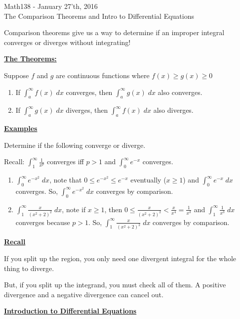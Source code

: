 \documentclass{letter}
\newcommand{\0}[1]{\begin{bmatrix}#1\end{bmatrix}}
\newcommand{\h}[1]{\underline{\textbf{#1}}}
\begin{document}
	\begin{center}
		\LARGE Math138 - January 27'th, 2016\\
		\large The Comparison Theorems and Intro to Differential Equations
	\end{center}
	\vspace{0.25 in}
	
	Comparison theorems give us a way to determine if an improper integral converges or diverges without integrating!
	
	\h{The Theorems:}
	
	Suppose $f$ and $g$ are continuous functions where $f(x) \geq g(x) \geq 0$
	
	\begin{enumerate}
		\item If $\displaystyle \int_a^\infty f(x)\;dx$ converges, then $\displaystyle \int_a^\infty g(x)\;dx$ also converges.
		\item If  $\displaystyle \int_a^\infty g(x)\;dx$ diverges, then  $\displaystyle \int_a^\infty f(x)\;dx$ also diverges.
	\end{enumerate}
	
	\h{Examples}
	
	Determine if the following converge or diverge.
	
	Recall: $\int_1^\infty \frac{1}{x^p}$ converges iff $p>1$ and $\int_0^\infty e^{-x}$ converges.
	
	\begin{enumerate}
		\item $\int_0^\infty e^{-x^2}\;dx$, note that $0 \leq e^{-x^2} \leq e^{-x}$ eventually ($x \geq 1$) and $\int_0^\infty e^{-x}\;dx$ converges. So, $\int_0^\infty e^{-x^2}\;dx$ converges by comparison.
		
		\item $\int_1^\infty \frac{x}{(x^2+2)^2}\;dx$, note if $x \geq 1$, then $0 \leq \frac{x}{(x^2+2)^2} < \frac{x}{x^4} = \frac{1}{x^3}$ and $\int_1^\infty \frac{1}{x^3}\; dx$ converges because $p>1$. So, $\int_1^\infty \frac{x}{(x^2+2)^2}\; dx$ converges by comparison.
	\end{enumerate}
	
	\h{Recall}
	
	If you split up the region, you only need one divergent integral for the whole thing to diverge.
	
	But, if you split up the integrand, you must check all of them. A positive divergence and a negative divergence can cancel out.
	
	\h{Introduction to Differential Equations}
	
\end{document}
